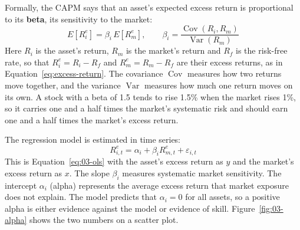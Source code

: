 Formally, the CAPM says that an asset's expected excess return is proportional to its \textbf{beta}, its sensitivity to the market:
\begin{equation}
  E[R^{e}_{i}] = \beta_i \, E[R^{e}_{m}], \qquad \beta_i = \frac{\operatorname{Cov}(R_i, R_m)}{\operatorname{Var}(R_m)}
  \label{eq:03-capm}
\end{equation}
Here $R_i$ is the asset's return, $R_m$ is the market's return and $R_f$ is the risk-free rate, so that $R^{e}_{i} = R_i - R_f$ and $R^{e}_{m} = R_m - R_f$ are their excess returns, as in Equation~\eqref{eq:excess-return}. The covariance $\operatorname{Cov}$ measures how two returns move together, and the variance $\operatorname{Var}$ measures how much one return moves on its own. A stock with a beta of 1.5 tends to rise 1.5\% when the market rises 1\%, so it carries one and a half times the market's systematic risk and should earn one and a half times the market's excess return.

The regression model is estimated in time series:
\begin{equation}
  R^{e}_{i,t} = \alpha_i + \beta_i R^{e}_{m,t} + \varepsilon_{i,t}
  \label{eq:03-capm-ts}
\end{equation}
This is Equation~\eqref{eq:03-ols} with the asset's excess return as $y$ and the market's excess return as $x$. The slope $\beta_i$ measures systematic market sensitivity. The intercept $\alpha_i$ (alpha) represents the average excess return that market exposure does not explain. The model predicts that $\alpha_i = 0$ for all assets, so a positive alpha is either evidence against the model or evidence of skill. Figure~\ref{fig:03-alpha} shows the two numbers on a scatter plot.


